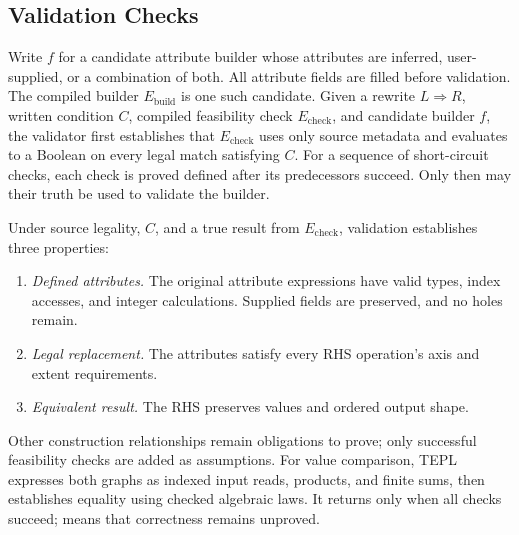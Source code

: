\subsection{Validation Checks}
\label{sec:validation-checks}
Write $f$ for a candidate attribute builder whose attributes are inferred,
user-supplied, or a combination of both. All attribute fields are filled
before validation. The compiled builder $E_{\mathrm{build}}$ is one such candidate.
Given a rewrite $L\Rightarrow R$, written condition $C$, compiled
feasibility check $E_{\mathrm{check}}$, and candidate builder $f$, the validator first
establishes that $E_{\mathrm{check}}$ uses only source metadata and evaluates to a Boolean
on every legal match satisfying $C$. For a sequence of short-circuit
checks, each check is proved defined after its predecessors succeed.
Only then may their truth be used to validate the builder.

Under source legality, $C$, and a true result from $E_{\mathrm{check}}$, validation
establishes three properties:
\begin{enumerate}
\item \emph{Defined attributes.}
The original attribute expressions have valid types, index accesses,
and integer calculations. Supplied fields are preserved, and no holes remain.
\item \emph{Legal replacement.}
The attributes satisfy every RHS operation's axis and extent requirements.
\item \emph{Equivalent result.}
The RHS preserves values and ordered output shape.
\end{enumerate}
Other construction relationships remain obligations to prove; only
successful feasibility checks are added as assumptions. For value comparison, TEPL expresses both
graphs as indexed input reads, products, and finite sums, then establishes
equality using checked algebraic laws. It returns  only when
all checks succeed;  means that correctness remains unproved.

